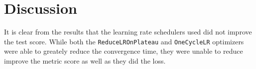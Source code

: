 \section{Discussion}
\label{sec:Discussion}

\begin{comment}
It is important to include a discussion, which describes what you have learned so far, the merits of the work as well as its limitations.
It can be a separate section or it can appear together with the results or be part of the conclusion).
When evaluating your results, avoid drawing grand conclusions, beyond those that your results can in fact support.
Further, although you may have designed your experiments to answer certain questions,
the results may raise other questions in the eyes of the reader.
It is important that you study the graphs/tables to look for unusual features/entries, and discuss these as well as the main findings.
In particular, carry out an error analysis: b went wrong and why?
\end{comment}

It is clear from the results that the learning rate schedulers used did not improve the test score. While both the \texttt{ReduceLROnPlateau} and \texttt{OneCycleLR} optimizers were able to greately reduce the convergence time, they were unable to reduce improve the metric score as well as they did the loss.